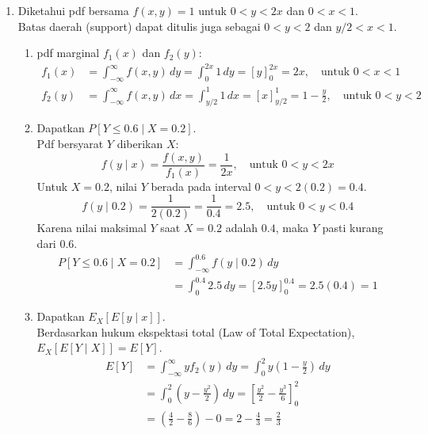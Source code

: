 \documentclass[11pt,letterpaper]{article}
\begin{document}
\begin{enumerate}
  \item Diketahui pdf bersama $f(x,y) = 1$ untuk $0 < y < 2x$ dan $0 < x < 1$. \\
        Batas daerah (support) dapat ditulis juga sebagai $0 < y < 2$ dan $y/2 < x < 1$.
        \begin{enumerate}[label=\alph*)]
          \item pdf marginal $f_1(x)$ dan $f_2(y)$:
                \begin{align*}
                  f_1(x) & = \int_{-\infty}^{\infty} f(x,y) \,dy = \int_{0}^{2x} 1 \,dy = [y]_{0}^{2x} = 2x, \quad \text{untuk } 0 < x < 1                \\
                  f_2(y) & = \int_{-\infty}^{\infty} f(x,y) \,dx = \int_{y/2}^{1} 1 \,dx = [x]_{y/2}^{1} = 1 - \frac{y}{2}, \quad \text{untuk } 0 < y < 2
                \end{align*}
          \item Dapatkan $P[Y \le 0.6 \mid X = 0.2]$. \\
                Pdf bersyarat $Y$ diberikan $X$:
                \[ f(y \mid x) = \frac{f(x,y)}{f_1(x)} = \frac{1}{2x}, \quad \text{untuk } 0 < y < 2x \]
                Untuk $X = 0.2$, nilai $Y$ berada pada interval $0 < y < 2(0.2) = 0.4$.
                \[ f(y \mid 0.2) = \frac{1}{2(0.2)} = \frac{1}{0.4} = 2.5, \quad \text{untuk } 0 < y < 0.4 \]
                Karena nilai maksimal $Y$ saat $X=0.2$ adalah $0.4$, maka $Y$ pasti kurang dari $0.6$.
                \begin{align*}
                  P[Y \le 0.6 \mid X = 0.2] & = \int_{-\infty}^{0.6} f(y \mid 0.2) \,dy                   \\
                                            & = \int_{0}^{0.4} 2.5 \,dy = [2.5y]_{0}^{0.4} = 2.5(0.4) = 1
                \end{align*}
          \item Dapatkan $E_X[E[y \mid x]]$. \\
                Berdasarkan hukum ekspektasi total (Law of Total Expectation), $E_X[E[Y \mid X]] = E[Y]$.
                \begin{align*}
                  E[Y] & = \int_{-\infty}^{\infty} y f_2(y) \,dy = \int_{0}^{2} y \left(1 - \frac{y}{2}\right) \,dy                \\
                       & = \int_{0}^{2} \left(y - \frac{y^2}{2}\right) \,dy = \left[ \frac{y^2}{2} - \frac{y^3}{6} \right]_{0}^{2} \\
                       & = \left( \frac{4}{2} - \frac{8}{6} \right) - 0 = 2 - \frac{4}{3} = \frac{2}{3}

\end{align*}
\end{enumerate}
\end{enumerate}
\end{document}
